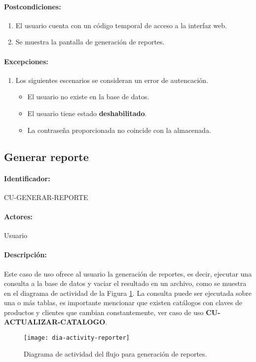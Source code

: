 \paragraph{Postcondiciones:}
\begin{enumerate}
  \item El usuario cuenta con un código temporal de acceso a la interfaz web.
  \item Se muestra la pantalla de generación de reportes.
\end{enumerate}
\paragraph{Excepciones:}
\begin{enumerate}
  \item Los siguientes escenarios se consideran un error de autencación.
  \begin{itemize}
    \item El usuario no existe en la base de datos.
    \item El usuario tiene estado \textbf{deshabilitado}.
    \item La contraseña proporcionada no coincide con la almacenada. 
  \end{itemize}
\end{enumerate}

\subsection{Generar reporte}\label{cu-generar-reporte}
\paragraph{Identificador:}
CU-GENERAR-REPORTE
\paragraph{Actores:}
Usuario
\paragraph{Descripción:}
Este caso de uso ofrece al usuario la generación de reportes, es decir, ejecutar una consulta a la base de datos y vaciar el resultado en un archivo, como se muestra en el diagrama de actividad de la Figura \ref{fig:dia-activity-reporter}. La consulta puede ser ejecutada sobre una o más tablas, es importante mencionar que existen catálogos con claves de productos y clientes que cambian constantemente, ver caso de uso \textbf{CU-ACTUALIZAR-CATALOGO}.
\begin{figure}[h]
  \centering
  \texttt{[image: dia-activity-reporter]}
  \caption{Diagrama de actividad del flujo para generación de reportes.}
  \label{fig:dia-activity-reporter}
\end{figure}
